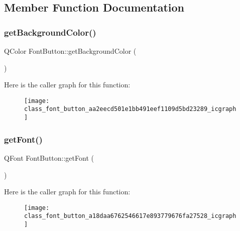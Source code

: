 \subsection{Member Function Documentation}
\mbox{\label{class_font_button_aa2eecd501e1bb491eef1109d5bd23289}} 
\subsubsection{get\+Background\+Color()}
{\footnotesize\ttfamily Q\+Color Font\+Button\+::get\+Background\+Color (\begin{DoxyParamCaption}{ }\end{DoxyParamCaption})\hspace{0.3cm}{\ttfamily [inline]}}

Here is the caller graph for this function\+:\nopagebreak
\begin{figure}[H]
\begin{center}
\leavevmode
\texttt{[image: class\_font\_button\_aa2eecd501e1bb491eef1109d5bd23289\_icgraph]}
\end{center}
\end{figure}
\mbox{\label{class_font_button_a18daa6762546617e893779676fa27528}} 
\subsubsection{get\+Font()}
{\footnotesize\ttfamily Q\+Font Font\+Button\+::get\+Font (\begin{DoxyParamCaption}{ }\end{DoxyParamCaption})\hspace{0.3cm}{\ttfamily [inline]}}

Here is the caller graph for this function\+:\nopagebreak
\begin{figure}[H]
\begin{center}
\leavevmode
\texttt{[image: class\_font\_button\_a18daa6762546617e893779676fa27528\_icgraph]}
\end{center}
\end{figure}
\mbox{\label{class_font_button_ab9be25fd2dcc721b7f8101742ff7bb25}} 
